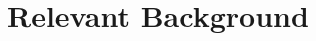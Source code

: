 \documentclass[letterpaper]{article} %
\newtheorem{definition}{Definition}
\begin{document}
\section{Relevant Background}






\end{document}
